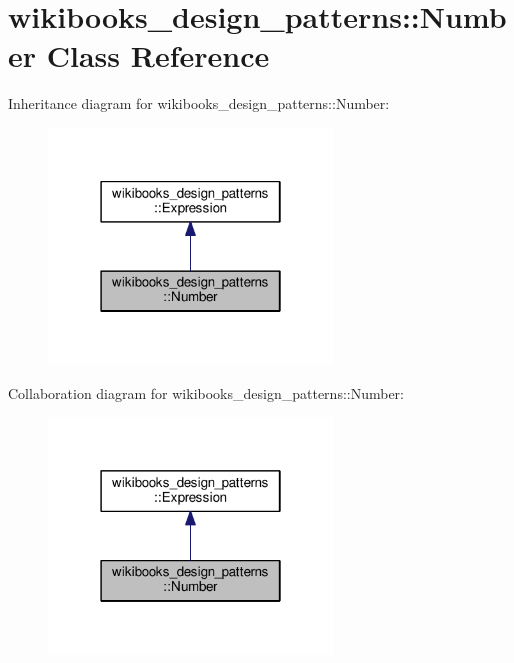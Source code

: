 \hypertarget{classwikibooks__design__patterns_1_1Number}{}\section{wikibooks\+\_\+design\+\_\+patterns\+:\+:Number Class Reference}
\label{classwikibooks__design__patterns_1_1Number}


Inheritance diagram for wikibooks\+\_\+design\+\_\+patterns\+:\+:Number\+:
\nopagebreak
\begin{figure}[H]
\begin{center}
\leavevmode
\includegraphics[width=214pt]{classwikibooks__design__patterns_1_1Number__inherit__graph}
\end{center}
\end{figure}


Collaboration diagram for wikibooks\+\_\+design\+\_\+patterns\+:\+:Number\+:
\nopagebreak
\begin{figure}[H]
\begin{center}
\leavevmode
\includegraphics[width=214pt]{classwikibooks__design__patterns_1_1Number__coll__graph}
\end{center}
\end{figure}
